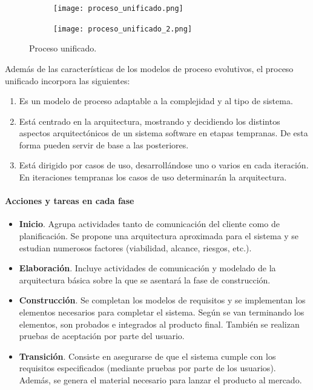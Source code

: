 \documentclass[12pt,spanish]{article}
\begin{document}
\begin{figure}[H]
			\centering
			\begin{subfigure}[b]{0.4\textwidth}
			\texttt{[image: proceso\_unificado.png]}
			\end{subfigure}
			\quad
			\begin{subfigure}[b]{0.5\textwidth}
			\texttt{[image: proceso\_unificado\_2.png]}
			\end{subfigure}

			\caption{Proceso unificado.}
\end{figure}
\newpage
Además de las características de los modelos de proceso evolutivos, el proceso unificado incorpora las siguientes:
\begin{enumerate}
	\item Es un modelo de proceso adaptable a la complejidad y al tipo de sistema.
	\item Está centrado en la arquitectura, mostrando y decidiendo los distintos aspectos arquitectónicos de un sistema software en etapas tempranas. De esta forma pueden servir de base a las posteriores.
	\item Está dirigido por casos de uso, desarrollándose uno o varios en cada iteración. En iteraciones tempranas los casos de uso determinarán la arquitectura.
\end{enumerate}
\paragraph{Acciones y tareas en cada fase}
\begin{itemize}
	\item \textbf{Inicio}. Agrupa actividades tanto de comunicación del cliente como de planificación. Se propone una arquitectura aproximada para el sistema y se estudian numerosos factores (viabilidad, alcance, riesgos, etc.).
	\item \textbf{Elaboración}. Incluye actividades de comunicación y modelado de la arquitectura básica sobre la que se asentará la fase de construcción.
	\item \textbf{Construcción}. Se completan los modelos de requisitos y se implementan los elementos necesarios para completar el sistema. Según se van terminando los elementos, son probados e integrados al producto final. También se realizan pruebas de aceptación por parte del usuario.
	\item \textbf{Transición}. Consiste en asegurarse de que el sistema cumple con los requisitos especificados (mediante pruebas por parte de los usuarios). Además, se genera el material necesario para lanzar el producto al mercado.
\end{itemize}
\end{document}
